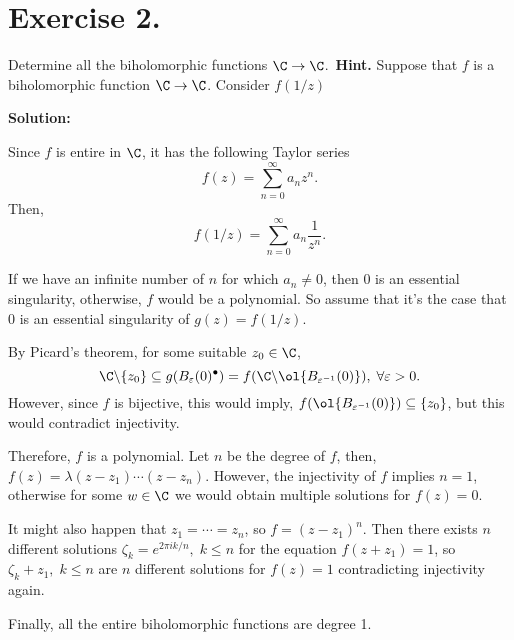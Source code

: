 \section*{Exercise 2.}

Determine all the biholomorphic functions $\C \to \C$.~\textbf{Hint.} Suppose that $f$ is a biholomorphic function $\C \to \C$. Consider $f(1/z)$

\textbf{Solution:}

Since $f$ is entire in $\C$, it has the following Taylor series
\[ f(z) = \sum_{n = 0}^{\infty} a_n z^n. \]
Then,
\[ f(1/z) = \sum_{n = 0}^{\infty} a_n \frac{1}{z^n}. \]

If we have an infinite number of $n$ for which $a_n \neq 0$, then 0 is an essential singularity, otherwise, $f$ would be a polynomial. So assume that it's the case that 0 is an essential singularity of $g(z) = f(1/z)$. 

By Picard's theorem, for some suitable $z_0 \in \C$,
\[ \C \backslash \{z_0\} \subseteq g(B_\varepsilon(0)^\bullet) = f(\C \backslash \ol{B_{\varepsilon^{-1}}(0)}),\; \forall \varepsilon > 0. \]
However, since $f$ is bijective, this would imply, $f(\ol{B_{\varepsilon^{-1}}(0)}) \subseteq \{z_0\}$, but this would contradict injectivity.

Therefore, $f$ is a polynomial. Let $n$ be the degree of $f$, then, $f(z) = \lambda (z-z_1)\cdots (z-z_n)$. However, the injectivity of $f$ implies $n = 1$, otherwise for some $w\in\C$ we would obtain multiple solutions for $f(z) = 0$. 

It might also happen that $z_1 = \cdots = z_n$, so $f = (z-z_1)^n$. Then there exists $n$ different solutions $\zeta_k = e^{2\pi i k/n},\; k\leq n$ for the equation $f(z+z_1) = 1$, so $\zeta_k + z_1,\; k \leq n$ are $n$ different solutions for $f(z) = 1$ contradicting injectivity again.

Finally, all the entire biholomorphic functions are degree 1.
